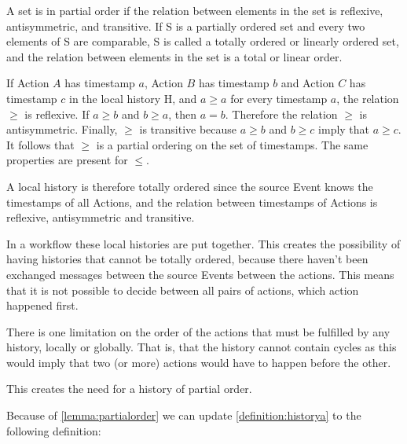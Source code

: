 \begin{lemma}\label{lemma:partialorder}
	A set is in partial order if the relation between elements in the set is reflexive, antisymmetric, and transitive.
	If S is a partially ordered set and every two elements of S are comparable, S is called a totally ordered or linearly ordered set, and the relation between elements in the set is a total or linear order.
	
	\newpar If Action $A$ has timestamp $a$, Action $B$ has timestamp $b$ and Action $C$ has timestamp $c$ in the local history H, and $a \geq a$ for every timestamp $a$, the relation $\geq$ is reflexive. If $a \geq b$ and $b \geq a$, then $a = b$. Therefore the relation $\geq$ is antisymmetric. Finally, $\geq$ is transitive because $a \geq b$ and $b \geq c$ imply that $a \geq c$. It follows that $\geq$ is a partial ordering on the set of timestamps. The same properties are present for $\leq$. 
	
	\newpar A local history is therefore totally ordered since the source Event knows the timestamps of all Actions, and the relation between timestamps of Actions is reflexive, antisymmetric and transitive. 
	
	\newpar In a workflow these local histories are put together. This creates the possibility of having histories that cannot be totally ordered, because there haven't been exchanged messages between the source Events between the actions. This means that it is not possible to decide between all pairs of actions, which action happened first.
	
	There is one limitation on the order of the actions that must be fulfilled by any history, locally or globally. That is, that the history cannot contain cycles as this would imply that two (or more) actions would have to happen before the other.
	
	
	This creates the need for a history of partial order.
\end{lemma}

\newpar Because of \autoref{lemma:partialorder} we can update \autoref{definition:historya} to the following definition:

